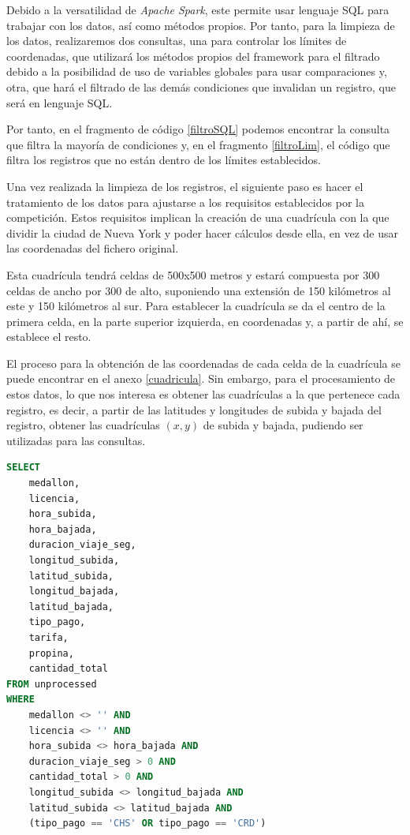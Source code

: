 Debido a la versatilidad de \textit{Apache Spark}, este permite usar lenguaje \gls{SQL} para trabajar con los datos, así como métodos propios. Por tanto, para la limpieza de los datos, realizaremos dos consultas, una para controlar los límites de coordenadas, que utilizará los métodos propios del \gls{framework} para el filtrado debido a la posibilidad de uso de variables globales para usar comparaciones y, otra, que hará el filtrado de las demás condiciones que invalidan un registro, que será en lenguaje \gls{SQL}.

Por tanto, en el fragmento de código \ref{filtroSQL} podemos encontrar la consulta que filtra la mayoría de condiciones y, en el fragmento \ref{filtroLim}, el código que filtra los registros que no están dentro de los límites establecidos.

Una vez realizada la limpieza de los registros, el siguiente paso es hacer el tratamiento de los datos para ajustarse a los requisitos establecidos por la competición. Estos requisitos implican la creación de una cuadrícula con la que dividir la ciudad de Nueva York y poder hacer cálculos desde ella, en vez de usar las coordenadas del fichero original.

Esta cuadrícula tendrá celdas de 500x500 metros y estará compuesta por 300 celdas de ancho por 300 de alto, suponiendo una extensión de 150 kilómetros al este y 150 kilómetros al sur. Para establecer la cuadrícula se da el centro de la primera celda, en la parte superior izquierda, en coordenadas y, a partir de ahí, se establece el resto.

El proceso para la obtención de las coordenadas de cada celda de la cuadrícula se puede encontrar en el anexo \ref{cuadricula}. Sin embargo, para el procesamiento de estos datos, lo que nos interesa es obtener las cuadrículas a la que pertenece cada registro, es decir, a partir de las latitudes y longitudes de subida y bajada del registro, obtener las cuadrículas $(x, y)$ de subida y bajada, pudiendo ser utilizadas para las consultas.

\clearpage
\begin{lstlisting}[label=filtroSQL,language=SQL,frame=single,caption=Filtro de registros en \gls{SQL} para registros inválidos]
SELECT 
    medallon,
    licencia,
    hora_subida,
    hora_bajada,
    duracion_viaje_seg,
    longitud_subida,
    latitud_subida,
    longitud_bajada,
    latitud_bajada,
    tipo_pago,
    tarifa,
    propina,
    cantidad_total
FROM unprocessed 
WHERE   
    medallon <> '' AND 
    licencia <> '' AND
    hora_subida <> hora_bajada AND
    duracion_viaje_seg > 0 AND
    cantidad_total > 0 AND
    longitud_subida <> longitud_bajada AND
    latitud_subida <> latitud_bajada AND
    (tipo_pago == 'CHS' OR tipo_pago == 'CRD')
\end{lstlisting}

